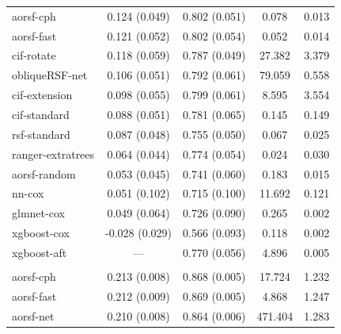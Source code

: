 \documentclass{article}\usepackage[]{graphicx}\usepackage[]{xcolor}
\newenvironment{knitrout}{}{} %
\begin{document}
\begin{knitrout}
\begin{longtable}[t]{lcccc}
\hspace{1em}aorsf-cph & 0.124 (0.049) & 0.802 (0.051) & 0.078 & 0.013\\
\hspace{1em}aorsf-fast & 0.121 (0.052) & 0.802 (0.054) & 0.052 & 0.014\\
\hspace{1em}cif-rotate & 0.118 (0.059) & 0.787 (0.049) & 27.382 & 3.379\\
\hspace{1em}obliqueRSF-net & 0.106 (0.051) & 0.792 (0.061) & 79.059 & 0.558\\
\hspace{1em}cif-extension & 0.098 (0.055) & 0.799 (0.061) & 8.595 & 3.554\\
\hspace{1em}cif-standard & 0.088 (0.051) & 0.781 (0.065) & 0.145 & 0.149\\
\hspace{1em}rsf-standard & 0.087 (0.048) & 0.755 (0.050) & 0.067 & 0.025\\
\hspace{1em}ranger-extratrees & 0.064 (0.044) & 0.774 (0.054) & 0.024 & 0.030\\
\hspace{1em}aorsf-random & 0.053 (0.045) & 0.741 (0.060) & 0.183 & 0.015\\
\hspace{1em}nn-cox & 0.051 (0.102) & 0.715 (0.100) & 11.692 & 0.121\\
\hspace{1em}glmnet-cox & 0.049 (0.064) & 0.726 (0.090) & 0.265 & 0.002\\
\hspace{1em}xgboost-cox & -0.028 (0.029) & 0.566 (0.093) & 0.118 & 0.002\\
\hspace{1em}xgboost-aft & --- & 0.770 (0.056) & 4.896 & 0.005\\
\addlinespace[0.3em]
\multicolumn{5}{l}{\textit{\textbf{Non-alcohol fatty liver disease; death, n = 17549, p = 24}}}\\
\hline
\hspace{1em}aorsf-cph & 0.213 (0.008) & 0.868 (0.005) & 17.724 & 1.232\\
\hspace{1em}aorsf-fast & 0.212 (0.009) & 0.869 (0.005) & 4.868 & 1.247\\
\hspace{1em}aorsf-net & 0.210 (0.008) & 0.864 (0.006) & 471.404 & 1.283\\

\end{longtable}
\end{knitrout}
\end{document}
